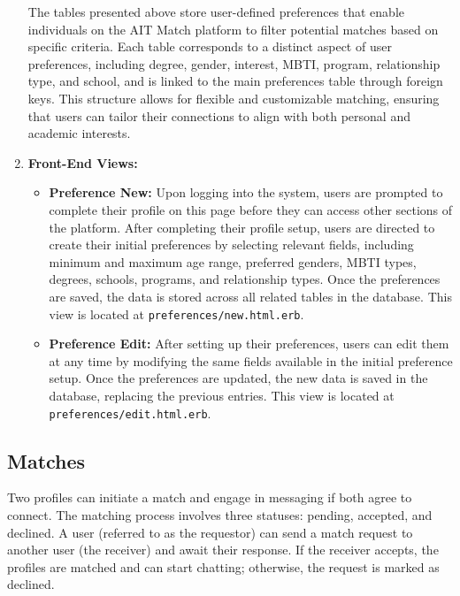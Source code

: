 \begin{enumerate}
    The tables presented above store user-defined preferences that enable individuals on the AIT Match platform to filter potential matches based on specific criteria. Each table corresponds to a distinct aspect of user preferences, including degree, gender, interest, MBTI, program, relationship type, and school, and is linked to the main preferences table through foreign keys. This structure allows for flexible and customizable matching, ensuring that users can tailor their connections to align with both personal and academic interests.
    
    \newpage
    \item \textbf{Front-End Views:}
    \begin{itemize}
        \item \textbf{Preference New:} Upon logging into the system, users are prompted to complete their profile on this page before they can access other sections of the platform. After completing their profile setup, users are directed to create their initial preferences by selecting relevant fields, including minimum and maximum age range, preferred genders, MBTI types, degrees, schools, programs, and relationship types. Once the preferences are saved, the data is stored across all related tables in the database. This view is located at \texttt{preferences/new.html.erb}.
    
        
        \item \textbf{Preference Edit:} After setting up their preferences, users can edit them at any time by modifying the same fields available in the initial preference setup. Once the preferences are updated, the new data is saved in the database, replacing the previous entries. This view is located at \texttt{preferences/edit.html.erb}.
    \end{itemize}
\end{enumerate} 
    \newpage 
    \subsection{Matches}
    Two profiles can initiate a match and engage in messaging if both agree to connect. The matching process involves three statuses: pending, accepted, and declined. A user (referred to as the requestor) can send a match request to another user (the receiver) and await their response. If the receiver accepts, the profiles are matched and can start chatting; otherwise, the request is marked as declined.

